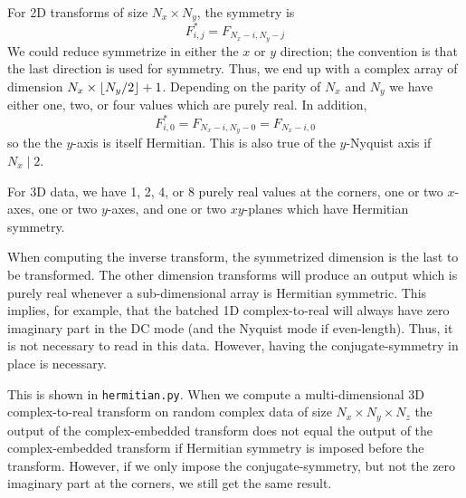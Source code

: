 \documentclass[12pt]{article}
\DeclarePairedDelimiter\floor{\lfloor}{\rfloor}
\renewcommand{\(}{\left(}
\renewcommand{\)}{\right)}
\begin{document}
For 2D transforms of size $N_x \times N_y$, the symmetry is
\begin{dmath}
  F_{i,j}^* = F_{N_x-i, N_y-j}
\end{dmath}
We could reduce symmetrize in either the $x$ or $y$ direction; the
convention is that the last direction is used for symmetry.  Thus, we
end up with a complex array of dimension $N_x \times \floor{N_y/2}+1$.
Depending on the parity of $N_x$ and $N_y$ we have either one, two, or
four values which are purely real.  In addition,
\begin{dmath}
  F_{i,0}^*
  = F_{N_x-i, N_y-0}
  = F_{N_x-i, 0}
\end{dmath}
so the the $y$-axis is itself Hermitian.  This is also true of the
$y$-Nyquist axis if $N_x\mid{}2$.

For 3D data, we have 1, 2, 4, or 8 purely real values at the corners,
one or two $x$-axes, one or two $y$-axes, and one or two $xy$-planes
which have Hermitian symmetry.

When computing the inverse transform, the symmetrized dimension is the
last to be transformed.  The other dimension transforms will produce
an output which is purely real whenever a sub-dimensional array is
Hermitian symmetric.  This implies, for example, that the batched 1D
complex-to-real will always have zero imaginary part in the DC mode
(and the Nyquist mode if even-length).  Thus, it is not necessary to
read in this data.  However, having the conjugate-symmetry in place
is necessary.

This is shown in \texttt{hermitian.py}.  When we compute a
multi-dimensional 3D complex-to-real transform on random complex data
of size $N_x\times{}N_y\times{}N_z$ the output of the complex-embedded
transform does not equal the output of the complex-embedded transform
if Hermitian symmetry is imposed before the transform.  However, if we
only impose the conjugate-symmetry, but not the zero imaginary part at
the corners, we still get the same result.
\end{document}

